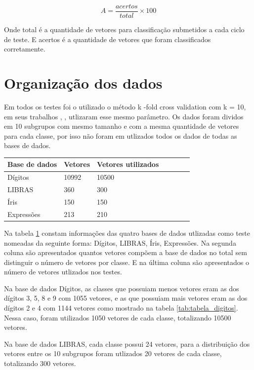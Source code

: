 $$A = \frac{acertos}{total}\times 100$$

Onde total é a quantidade de vetores para classificação submetidos a cada ciclo de teste. E acertos é a quantidade de vetores que foram classificados corretamente.

\section{Organização dos dados}
Em todos os testes foi o utilizado o método k -fold cross validation com k = 10, em seus trabalhos , ,  utlizaram esse mesmo parâmetro. Os dados foram dividos em 10 subgrupos com mesmo tamanho \cite{Guo} e com a mesma quantidade de vetores para cada classe, por isso não foram em utlizados todos os dados de todas as bases de dados.

\begin{table}
	\begin{tabular}{|l|l|l|l|p{3cm}|p{3cm}|p{2cm}|}
        \hline
        Base de dados & Vetores & Vetores utilizados\\ \hline
		Dígitos    &10992  & 10500 \\ \hline
		LIBRAS     & 360   & 300   \\ \hline
		Íris       & 150   & 150   \\ \hline
		Expressões & 213   & 210   \\ \hline
	\end{tabular}
	\label{tab:org_dados}
\end{table}

Na tabela \ref{tab:org_dados} constam informações das quatro bases de dados utlizadas como teste nomeadas da seguinte forma: Dígitos, LIBRAS, Íris, Expressões. Na segunda coluna são apresentados quantos vetores compõem a base de dados no total sem distinguir o número de vetores por classe. E na última coluna são apresentados o número de vetores utlizados nos testes.

Na base de dados Dígitos, as classes que possuiam menos vetores eram as dos dígitos 3, 5, 8 e 9 com 1055 vetores, e as que possuiam mais vetores eram as dos dígitos 2 e 4 com 1144 vetores como mostrado na tabela \ref{tab:tabela_digitos}. Nessa caso, foram utilizados 1050 vetores de cada classe, totalizando 10500 vetores.

Na base de dados LIBRAS, cada classe possui 24 vetores, para a distribuição dos vetores entre os 10 subgrupos foram utlizados 20 vetores de cada classe, totalizando 300 vetores.

